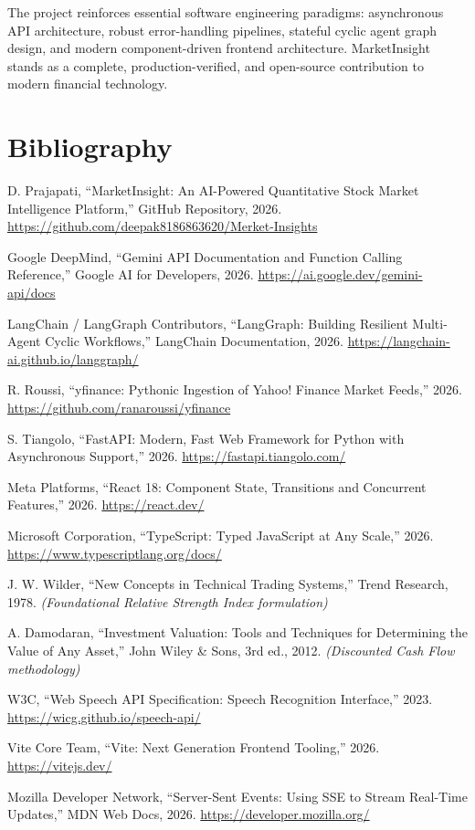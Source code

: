 \documentclass[12pt,a4paper]{report}
\begin{document}
The project reinforces essential software engineering paradigms: asynchronous API architecture, robust error-handling pipelines, stateful cyclic agent graph design, and modern component-driven frontend architecture. MarketInsight stands as a complete, production-verified, and open-source contribution to modern financial technology.

\clearpage
\chapter*{Bibliography}

\begin{enumerate}[leftmargin=*,label={[\arabic*]}]
  \item D. Prajapati, ``MarketInsight: An AI-Powered Quantitative Stock Market Intelligence Platform,'' GitHub Repository, 2026. \url{https://github.com/deepak8186863620/Merket-Insights}
  \item Google DeepMind, ``Gemini API Documentation and Function Calling Reference,'' Google AI for Developers, 2026. \url{https://ai.google.dev/gemini-api/docs}
  \item LangChain / LangGraph Contributors, ``LangGraph: Building Resilient Multi-Agent Cyclic Workflows,'' LangChain Documentation, 2026. \url{https://langchain-ai.github.io/langgraph/}
  \item R. Roussi, ``yfinance: Pythonic Ingestion of Yahoo! Finance Market Feeds,'' 2026. \url{https://github.com/ranaroussi/yfinance}
  \item S. Tiangolo, ``FastAPI: Modern, Fast Web Framework for Python with Asynchronous Support,'' 2026. \url{https://fastapi.tiangolo.com/}
  \item Meta Platforms, ``React 18: Component State, Transitions and Concurrent Features,'' 2026. \url{https://react.dev/}
  \item Microsoft Corporation, ``TypeScript: Typed JavaScript at Any Scale,'' 2026. \url{https://www.typescriptlang.org/docs/}
  \item J. W. Wilder, ``New Concepts in Technical Trading Systems,'' Trend Research, 1978. \textit{(Foundational Relative Strength Index formulation)}
  \item A. Damodaran, ``Investment Valuation: Tools and Techniques for Determining the Value of Any Asset,'' John Wiley \& Sons, 3rd ed., 2012. \textit{(Discounted Cash Flow methodology)}
  \item W3C, ``Web Speech API Specification: Speech Recognition Interface,'' 2023. \url{https://wicg.github.io/speech-api/}
  \item Vite Core Team, ``Vite: Next Generation Frontend Tooling,'' 2026. \url{https://vitejs.dev/}
  \item Mozilla Developer Network, ``Server-Sent Events: Using SSE to Stream Real-Time Updates,'' MDN Web Docs, 2026. \url{https://developer.mozilla.org/}
\end{enumerate}
\end{document}
